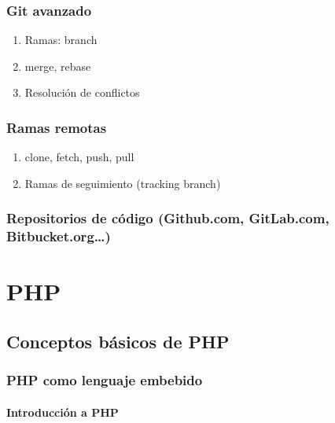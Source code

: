 \documentclass[a4paper,11pt,spanish]{sphinxmanual}
\begin{document}
\section{Git avanzado}
\label{\detokenize{contenidos:id47}}\begin{enumerate}
\item {} 
Ramas: branch

\item {} 
merge, rebase

\item {} 
Resolución de conflictos

\end{enumerate}


\section{Ramas remotas}
\label{\detokenize{contenidos:id48}}\begin{enumerate}
\item {} 
clone, fetch, push, pull

\item {} 
Ramas de seguimiento (tracking branch)

\end{enumerate}


\section{Repositorios de código (Github.com, GitLab.com, Bitbucket.org…)}
\label{\detokenize{contenidos:id49}}

\part{PHP}
\label{\detokenize{contenidos:id50}}

\chapter{Conceptos básicos de PHP}
\label{\detokenize{contenidos:id51}}

\section{PHP como lenguaje embebido}
\label{\detokenize{contenidos:id52}}

\subsection{Introducción a PHP}
\label{\detokenize{contenidos:id53}}
\end{document}
